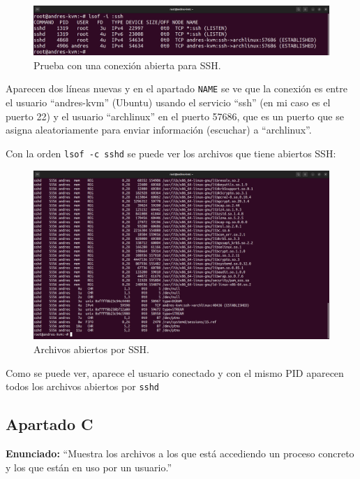 \documentclass{article}
\begin{document}
\begin{figure}[H]
    \includegraphics[width=\textwidth]{imagenes/lsofissharch.png}
    \caption{Prueba con una conexión abierta para SSH.}
\end{figure}


Aparecen dos líneas nuevas y en el apartado \verb|NAME| se ve que la conexión es entre el usuario ``andres-kvm'' (Ubuntu) usando el servicio ``ssh'' (en mi caso es el puerto 22)  y el usuario ``archlinux'' en el puerto 57686, que es un puerto que se asigna aleatoriamente para enviar información (escuchar) a ``archlinux''.

\bigskip

Con la orden \verb|lsof -c sshd| se puede ver los archivos que tiene abiertos SSH:

\begin{figure}[H]
    \includegraphics[width=\textwidth]{imagenes/lsofcsshd.png}
    \caption{Archivos abiertos por SSH.}
\end{figure}

Como se puede ver, aparece el usuario conectado y con el mismo PID aparecen todos los archivos abiertos por \verb|sshd|

\newpage

\subsection{Apartado C}

\textbf{Enunciado: }``Muestra los archivos a los que está accediendo un proceso concreto y los que están en uso por un usuario.''
\end{document}
